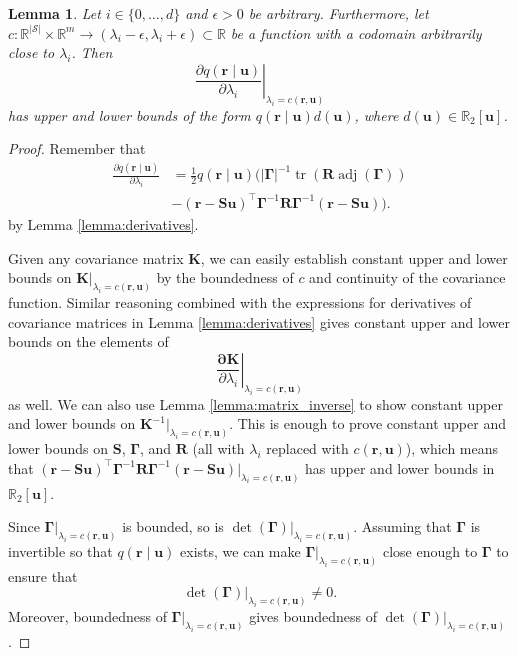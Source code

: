 \documentclass{mpaper}
\newtheorem{lemma}[theorem]{Lemma}
\DeclareMathOperator{\adj}{adj}
\DeclareMathOperator{\tr}{tr}
\begin{document}
\begin{lemma} \label{lemma:bound1}
  Let $i \in \{ 0, \dots, d \}$ and $\epsilon > 0$ be arbitrary. Furthermore,
  let $c : \mathbb{R}^{|\mathcal{S}|} \times \mathbb{R}^m \to (\lambda_i -
  \epsilon, \lambda_i + \epsilon) \subset \mathbb{R}$ be a function with a
  codomain arbitrarily close to $\lambda_i$. Then
  \[
    \left. \frac{\partial q(\mathbf{r} \mid \mathbf{u})}{\partial \lambda_i}
    \right|_{\lambda_i = c(\mathbf{r}, \mathbf{u})}
  \]
  has upper and lower bounds of the form $q(\mathbf{r} \mid
  \mathbf{u})d(\mathbf{u})$, where $d(\mathbf{u}) \in \mathbb{R}_2[\mathbf{u}]$.
\end{lemma}
\begin{proof}
  Remember that
  \begin{align*}
    \frac{\partial q(\mathbf{r} \mid \mathbf{u})}{\partial \lambda_i} &= \frac{1}{2}q(\mathbf{r} \mid \mathbf{u}) (|\bm\Gamma|^{-1} \tr(\mathbf{R} \adj(\bm\Gamma)) \\
                                                                      &- (\mathbf{r} - \mathbf{Su})^\intercal\bm\Gamma^{-1}\mathbf{R}\bm\Gamma^{-1}(\mathbf{r} - \mathbf{Su})).
  \end{align*}
  by Lemma \ref{lemma:derivatives}.

  Given any covariance matrix $\mathbf{K}$, we can easily establish constant
  upper and lower bounds on $\mathbf{K}|_{\lambda_i = c(\mathbf{r},
    \mathbf{u})}$ by the boundedness of $c$ and continuity of the covariance
  function. Similar reasoning combined with the expressions for derivatives of
  covariance matrices in Lemma \ref{lemma:derivatives} gives constant upper and
  lower bounds on the elements of
  \[
    \left. \frac{\mathbf{\partial K}}{\partial \lambda_i} \right|_{\lambda_i =
      c(\mathbf{r}, \mathbf{u})}
  \]
  as well. We can also use Lemma \ref{lemma:matrix_inverse} to show constant
  upper and lower bounds on $\mathbf{K}^{-1}|_{\lambda_i = c(\mathbf{r},
    \mathbf{u})}$. This is enough to prove constant upper and lower bounds on
  $\mathbf{S}$, $\bm\Gamma$, and $\mathbf{R}$ (all with $\lambda_i$ replaced
  with $c(\mathbf{r}, \mathbf{u})$), which means that $(\mathbf{r} -
  \mathbf{Su})^\intercal\bm\Gamma^{-1}\mathbf{R}\bm\Gamma^{-1}(\mathbf{r} -
  \mathbf{Su})|_{\lambda_i = c(\mathbf{r}, \mathbf{u})}$ has upper and lower
  bounds in $\mathbb{R}_2[\mathbf{u}]$.
  
  Since $\bm\Gamma|_{\lambda_i = c(\mathbf{r}, \mathbf{u})}$ is bounded, so is
  $\det(\bm\Gamma)|_{\lambda_i = c(\mathbf{r}, \mathbf{u})}$. Assuming that
  $\bm\Gamma$ is invertible so that $q(\mathbf{r} \mid \mathbf{u})$ exists, we
  can make $\bm\Gamma|_{\lambda_i = c(\mathbf{r}, \mathbf{u})}$ close enough to
  $\bm\Gamma$ to ensure that
  \[
    \det(\bm\Gamma)|_{\lambda_i = c(\mathbf{r}, \mathbf{u})} \ne 0.
  \]
  Moreover, boundedness of $\bm\Gamma|_{\lambda_i = c(\mathbf{r}, \mathbf{u})}$
  gives boundedness of $\det(\bm\Gamma)|_{\lambda_i = c(\mathbf{r},
    \mathbf{u})}$.


\end{proof}
\end{document}

